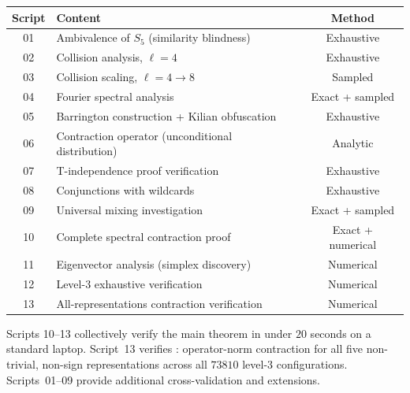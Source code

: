 \documentclass[version=submission]{iacrcc}
\begin{document}
\begin{center}
\begin{tabular}{clc}
\toprule
Script & Content & Method \\
\midrule
01 & Ambivalence of $S_5$ (similarity blindness) & Exhaustive \\
02 & Collision analysis, $\ell = 4$ & Exhaustive \\
03 & Collision scaling, $\ell = 4 \to 8$ & Sampled \\
04 & Fourier spectral analysis & Exact + sampled \\
05 & Barrington construction + Kilian obfuscation & Exhaustive \\
06 & Contraction operator (unconditional distribution) & Analytic \\
07 & T-independence proof verification & Exhaustive \\
08 & Conjunctions with wildcards & Exhaustive \\
09 & Universal mixing investigation & Exact + sampled \\
10 & Complete spectral contraction proof & Exact + numerical \\
11 & Eigenvector analysis (simplex discovery) & Numerical \\
12 & Level-$3$ exhaustive verification & Numerical \\
13 & All-representations contraction verification & Numerical \\
\bottomrule
\end{tabular}
\end{center}

Scripts 10--13 collectively verify the main theorem in under $20$ seconds
on a standard laptop. Script~13 verifies :
operator-norm contraction for all five non-trivial, non-sign representations
across all $73810$ level-$3$ configurations.
Scripts~01--09 provide additional cross-validation and extensions.



\end{document}
